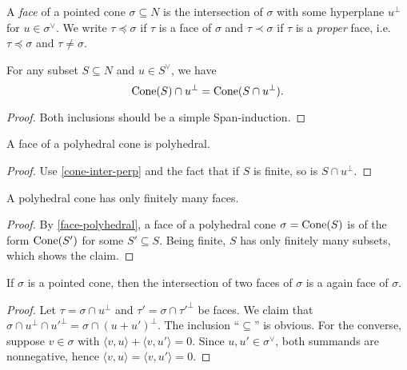 \begin{definition}
  \label{face}
  A \emph{face} of a pointed cone \( \sigma \subseteq N \) is the
  intersection of \( \sigma \) with some hyperplane \( u^{\perp} \)
  for \( u \in \sigma^{\vee} \). We write \( \tau \preceq \sigma \) if
  \( \tau \) is a face of \( \sigma \) and \( \tau \prec \sigma \) if
  \( \tau \) is a \emph{proper} face, i.e. \( \tau \preceq \sigma \)
  and \( \tau \neq \sigma \).
\end{definition}

\begin{proposition}
  \label{cone-inter-perp}
  For any subset \( S \subseteq N \) and \( u \in S^{\vee} \), we have
  \[
      \operatorname{Cone}(S) \cap u^{\perp} = \operatorname{Cone}(S \cap u^{\perp}).
  \]
\end{proposition}
\begin{proof}
    Both inclusions should be a simple Span-induction.
\end{proof}

\begin{lemma}
  \label{face-polyhedral}
  A face of a polyhedral cone is polyhedral.
\end{lemma}
\begin{proof}
  Use \ref{cone-inter-perp} and the fact that if \( S \) is finite,
  so is \( S \cap u^{\perp} \).
\end{proof}



\begin{lemma}
  \label{faces-polyhedral-cone-finite}
  A polyhedral cone has only finitely many faces.
\end{lemma}
\begin{proof}
  \uses{}
  By \ref{face-polyhedral}, a face of a polyhedral cone \( \sigma =
  \operatorname{Cone}(S) \) is of the form \( \operatorname{Cone}(S') \) for some \( S' \subseteq
  S \). Being finite, \( S \) has only finitely many subsets, which
  shows the claim.
\end{proof}


\begin{lemma}
  \label{face-intersection}
  If \( \sigma \) is a pointed cone, then the intersection of two
  faces of \( \sigma \) is a again face of \( \sigma \).
\end{lemma}
\begin{proof}
  \uses{}
  Let \( \tau = \sigma \cap u^{\perp} \) and \( \tau' = \sigma \cap
  \tau'^{\perp} \) be faces. We claim that \( \sigma \cap u^{\perp}
  \cap u'^{\perp} = \sigma \cap (u + u')^{\perp} \). The inclusion
  ``\( \subseteq \)'' is obvious. For the converse, suppose \( v \in
  \sigma \) with \( \langle v, u \rangle + \langle v, u' \rangle = 0
  \). Since \( u, u' \in \sigma^{\vee} \), both summands are
  nonnegative, hence \( \langle v, u \rangle = \langle v, u' \rangle =
  0 \).
\end{proof}

